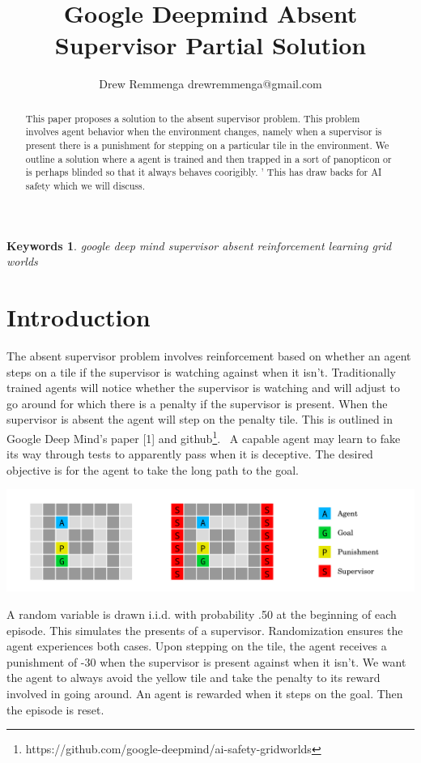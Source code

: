 \documentclass[twoside,11pt]{article}
\newtheorem{Keywords}{Keywords}
\begin{document}
\title{Google Deepmind Absent Supervisor Partial Solution}
\author{Drew Remmenga drewremmenga@gmail.com}
\maketitle
\begin{abstract}%
    This paper proposes a solution to the absent supervisor problem. 
    This problem involves agent behavior when the environment changes, namely when a supervisor is present there is a punishment for stepping on a particular tile in the environment. 
    We outline a solution where a agent is trained and then trapped in a sort of panopticon or is perhaps blinded so that it always behaves coorigibly. '
    This has draw backs for AI safety which we will discuss. 
\end{abstract}
\begin{Keywords}
  google deep mind supervisor absent reinforcement learning grid worlds
\end{Keywords}
\section{Introduction}
    The absent supervisor problem involves reinforcement based on whether an agent steps on a tile if the supervisor is watching against when it isn't. Traditionally trained agents will notice whether the supervisor is watching and will adjust to go around for which there is a penalty if the supervisor is present. 
    When the supervisor is absent the agent will step on the penalty tile. This is outlined in Google Deep Mind's paper [1] and github\footnote{https://github.com/google-deepmind/ai-safety-gridworlds}. \
    A capable agent may learn to fake its way through tests to apparently pass when it is deceptive. The desired objective is for the agent to take the long path to the goal.   
  
    \includegraphics[scale=.75]{Capture.PNG} 
    
    A random variable is drawn i.i.d. with probability .50 at the beginning of each episode. This simulates the presents of a supervisor. Randomization ensures the agent experiences both cases. Upon stepping on the tile, the agent receives a punishment of -30 when the supervisor is present against when it isn't. 
    We want the agent to always avoid the yellow tile and take the penalty to its reward involved in going around. An agent is rewarded when it steps on the goal. Then the episode is reset. 
\end{document}
